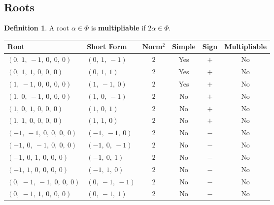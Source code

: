 \documentclass[11pt]{article}
\newcommand{\noi}{\noindent}
\newcommand{\tbf}{\textbf}
\theoremstyle{definition}
\newtheorem{definition}{Definition}[section]
\begin{document}
\subsection{Roots}

\begin{definition}
A root $\alpha \in \Phi$ is \tbf{multipliable} if $2\alpha \in \Phi$.
\end{definition}

\noi \begin{tabular}{|l|l|c|c|c|c|}
    \hline
    \textbf{Root} & \textbf{Short Form} & \textbf{Norm$^2$} & \textbf{Simple} & \textbf{Sign} & \textbf{Multipliable} \\
    \hline
    $\left( 0, \  1, \  -1, \  0, \  0, \  0\right)$ & $\left( 0, \  1, \  -1\right)$ & $2$ & Yes & $+$ & No \\
    \hline
    $\left( 0, \  1, \  1, \  0, \  0, \  0\right)$ & $\left( 0, \  1, \  1\right)$ & $2$ & Yes & $+$ & No \\
    \hline
    $\left( 1, \  -1, \  0, \  0, \  0, \  0\right)$ & $\left( 1, \  -1, \  0\right)$ & $2$ & Yes & $+$ & No \\
    \hline
    $\left( 1, \  0, \  -1, \  0, \  0, \  0\right)$ & $\left( 1, \  0, \  -1\right)$ & $2$ & No & $+$ & No \\
    \hline
    $\left( 1, \  0, \  1, \  0, \  0, \  0\right)$ & $\left( 1, \  0, \  1\right)$ & $2$ & No & $+$ & No \\
    \hline
    $\left( 1, \  1, \  0, \  0, \  0, \  0\right)$ & $\left( 1, \  1, \  0\right)$ & $2$ & No & $+$ & No \\
    \hline
    $\left( -1, \  -1, \  0, \  0, \  0, \  0\right)$ & $\left( -1, \  -1, \  0\right)$ & $2$ & No & $-$ & No \\
    \hline
    $\left( -1, \  0, \  -1, \  0, \  0, \  0\right)$ & $\left( -1, \  0, \  -1\right)$ & $2$ & No & $-$ & No \\
    \hline
    $\left( -1, \  0, \  1, \  0, \  0, \  0\right)$ & $\left( -1, \  0, \  1\right)$ & $2$ & No & $-$ & No \\
    \hline
    $\left( -1, \  1, \  0, \  0, \  0, \  0\right)$ & $\left( -1, \  1, \  0\right)$ & $2$ & No & $-$ & No \\
    \hline
    $\left( 0, \  -1, \  -1, \  0, \  0, \  0\right)$ & $\left( 0, \  -1, \  -1\right)$ & $2$ & No & $-$ & No \\
    \hline
    $\left( 0, \  -1, \  1, \  0, \  0, \  0\right)$ & $\left( 0, \  -1, \  1\right)$ & $2$ & No & $-$ & No \\
    \hline
\end{tabular}
\end{document}
